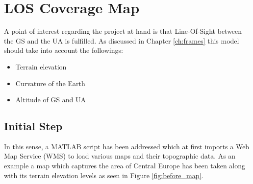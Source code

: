 \section{LOS Coverage Map}\label{sec:los_map}
A point of interest regarding the project at hand is that Line-Of-Sight between the GS and the UA is fulfilled. As discussed in Chapter \ref{ch:frames} this model should take into account the followings:

\begin{itemize}
	\item Terrain elevation
	\item Curvature of the Earth
	\item Altitude of GS and UA
\end{itemize}

\subsection{Initial Step}
In this sense, a MATLAB script has been addressed which at first imports a Web Map Service (WMS) to load various maps and their topographic data. As an example a map which captures the area of Central Europe has been taken along with its terrain elevation levels as seen in Figure \ref{fig:before_map}.

